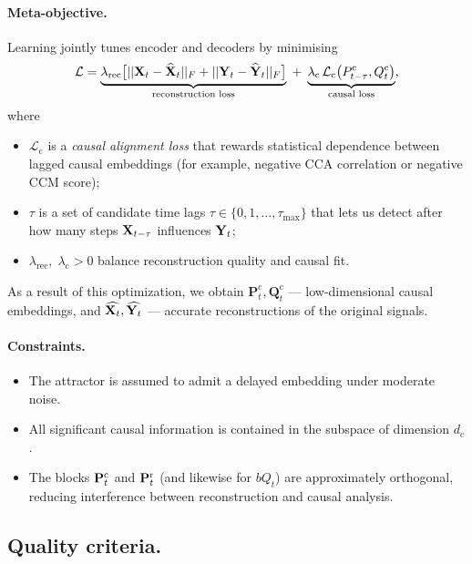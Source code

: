 \documentclass[14pt]{extarticle}
\begin{document}
	\paragraph{Meta-objective.}
	Learning jointly tunes encoder and decoders by minimising
	\[
	\mathcal L
	=
	\underbrace{\lambda_{\mathrm{rec}}
		\bigl[
		|| \mathbf{X}_t - \widehat {\mathbf{X}}_t ||_F + || \mathbf{Y}_t - \widehat {\mathbf{Y}}_t ||_F
		\bigr]}_{\text{reconstruction loss}}
	\;+\;
	\underbrace{\lambda_{\mathrm{c}}
		\,\mathcal L_{\mathrm c}\bigl(P_{t-\tau}^{\mathrm c},Q_t^{\mathrm c}\bigr)}_{\text{causal loss}},
	\]
	where  
	
	\begin{itemize}[leftmargin=1.4cm]
		\item $\mathcal L_{\mathrm c}$ is a \emph{causal alignment loss} that rewards statistical dependence between lagged causal embeddings  
		(for example, negative CCA correlation or negative CCM score);
		\item $\tau$ is a set of candidate time lags  
		$\tau \in \{0,1,\dots,\tau_{\max}\}$ that lets us detect after how many steps $\mathbf{X}_{t - \tau}$ influences $\mathbf{Y}_t$;
		\item $\lambda_{\mathrm{rec}}, \; \lambda_{\mathrm{c}}>0$ balance reconstruction quality and causal fit.
	\end{itemize}

	As a result of this optimization, we obtain
	$\mathbf P_t^{\mathrm c}, \mathbf Q_t^{\mathrm c}$ — low-dimensional causal embeddings, and 
	$\widehat{\mathbf{X}_t}, \widehat{\mathbf{Y}_t}$ — accurate reconstructions of the original signals.

	\paragraph{Constraints.}
	\begin{itemize}[nosep,leftmargin=1.2cm]
		\item The attractor is assumed to admit a delayed embedding under moderate noise.
		\item All significant causal information is contained in the subspace of dimension $d_{\mathrm c}$.
		\item The blocks $\mathbf{P}^{\mathrm c}_t$ and $\mathbf{P}^{\mathrm r}_t$ 
		(and likewise for $bQ_t$) are approximately orthogonal, reducing interference between reconstruction and causal analysis.
	\end{itemize}
	
	\subsection{Quality criteria.} \label{subsec:quality}
\end{document}
